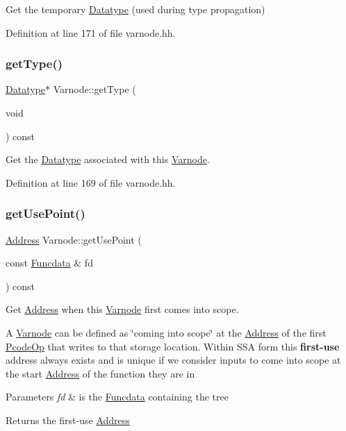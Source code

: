 Get the temporary \mbox{\hyperlink{class_datatype}{Datatype}} (used during type propagation) 



Definition at line 171 of file varnode.\+hh.

\mbox{\label{class_varnode_a8985a121184a10d08f28049cde4b2ff4}} 
\subsubsection{\texorpdfstring{getType()}{getType()}}
{\footnotesize\ttfamily \mbox{\hyperlink{class_datatype}{Datatype}}$\ast$ Varnode\+::get\+Type (\begin{DoxyParamCaption}\item[{void}]{ }\end{DoxyParamCaption}) const\hspace{0.3cm}{\ttfamily [inline]}}



Get the \mbox{\hyperlink{class_datatype}{Datatype}} associated with this \mbox{\hyperlink{class_varnode}{Varnode}}. 



Definition at line 169 of file varnode.\+hh.

\mbox{\label{class_varnode_a9eab83050278fb3bd44d6179154e38de}} 
\subsubsection{\texorpdfstring{getUsePoint()}{getUsePoint()}}
{\footnotesize\ttfamily \mbox{\hyperlink{class_address}{Address}} Varnode\+::get\+Use\+Point (\begin{DoxyParamCaption}\item[{const \mbox{\hyperlink{class_funcdata}{Funcdata}} \&}]{fd }\end{DoxyParamCaption}) const}



Get \mbox{\hyperlink{class_address}{Address}} when this \mbox{\hyperlink{class_varnode}{Varnode}} first comes into scope. 

A \mbox{\hyperlink{class_varnode}{Varnode}} can be defined as \char`\"{}coming into scope\char`\"{} at the \mbox{\hyperlink{class_address}{Address}} of the first \mbox{\hyperlink{class_pcode_op}{Pcode\+Op}} that writes to that storage location. Within S\+SA form this {\bfseries{first-\/use}} address always exists and is unique if we consider inputs to come into scope at the start \mbox{\hyperlink{class_address}{Address}} of the function they are in 
\begin{DoxyParams}{Parameters}
{\em fd} & is the \mbox{\hyperlink{class_funcdata}{Funcdata}} containing the tree \\
\hline
\end{DoxyParams}
\begin{DoxyReturn}{Returns}
the first-\/use \mbox{\hyperlink{class_address}{Address}} 
\end{DoxyReturn}


